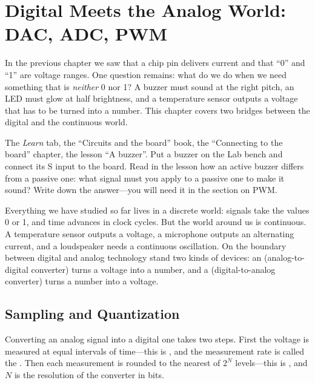 \chapter{Digital Meets the Analog World: DAC, ADC, PWM}
\label{ch:analog}

In the previous chapter we saw that a chip pin delivers current and that ``0'' and ``1'' are
voltage ranges. One question remains: what do we do when we need something that is \emph{neither} 0 nor
1? A buzzer must sound at the right pitch, an LED must glow at half brightness, and a
temperature sensor outputs a voltage that has to be turned into a number. This
chapter covers two bridges between the digital and the continuous world.

\begin{buildbox}
The \emph{Learn} tab, the ``Circuits and the board'' book, the ``Connecting to the board'' chapter, the lesson
``A buzzer''. Put a buzzer on the Lab bench and connect its S input to the
board. Read in the lesson how an active buzzer differs from a passive one:
what signal must you apply to a passive one to make it sound? Write down the
answer---you will need it in the section on PWM.
\end{buildbox}

Everything we have studied so far lives in a discrete world: signals take
the values 0 or 1, and time advances in clock cycles. But the world around us is continuous. A temperature
sensor outputs a voltage, a microphone outputs an alternating current, and a loudspeaker
needs a continuous oscillation. On the boundary between digital and analog
technology stand two kinds of devices: an  (analog-to-digital converter)
turns a voltage into a number, and a  (digital-to-analog converter)
turns a number into a voltage.

\section{Sampling and Quantization}

Converting an analog signal into a digital one takes two steps. First the
voltage is measured at equal intervals of time---this is
, and the measurement rate is called the . Then each measurement is rounded to the nearest of
$2^N$ levels---this is , and $N$ is the resolution of the converter in bits.

